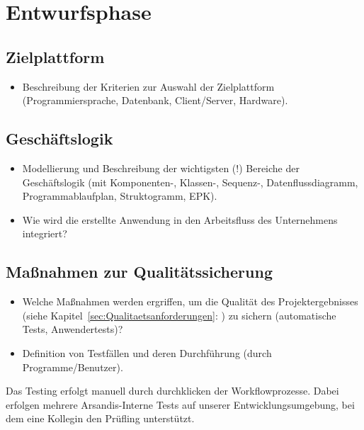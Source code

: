 \section{Entwurfsphase} 
\label{sec:Entwurfsphase}

\subsection{Zielplattform} %
\label{sec:Zielplattform}

\begin{itemize}
	\item Beschreibung der Kriterien zur Auswahl der Zielplattform (\ua Programmiersprache, Datenbank, Client/Server, Hardware).
\end{itemize}

\subsection{Geschäftslogik} %
\label{sec:Geschaeftslogik}

\begin{itemize}
	\item Modellierung und Beschreibung der wichtigsten (!) Bereiche der Geschäftslogik (\zB mit Kom\-po\-nen\-ten-, Klassen-, Sequenz-, Datenflussdiagramm, Programmablaufplan, Struktogramm, EPK).
	\item Wie wird die erstellte Anwendung in den Arbeitsfluss des Unternehmens integriert?
\end{itemize}


\subsection{Maßnahmen zur Qualitätssicherung} %
\label{sec:Qualitaetssicherung}
\begin{itemize}
	\item Welche Maßnahmen werden ergriffen, um die Qualität des Projektergebnisses (siehe Kapitel~\ref{sec:Qualitaetsanforderungen}: ) zu sichern (\zB automatische Tests, Anwendertests)?
	\item \Ggfs Definition von Testfällen und deren Durchführung (durch Programme/Benutzer).
\end{itemize}

Das Testing erfolgt manuell durch \glqq durchklicken\grqq{} der Workflowprozesse.
Dabei erfolgen mehrere Arsandis-Interne Tests auf unserer Entwicklungsumgebung, bei dem eine Kollegin den Prüfling unterstützt.


